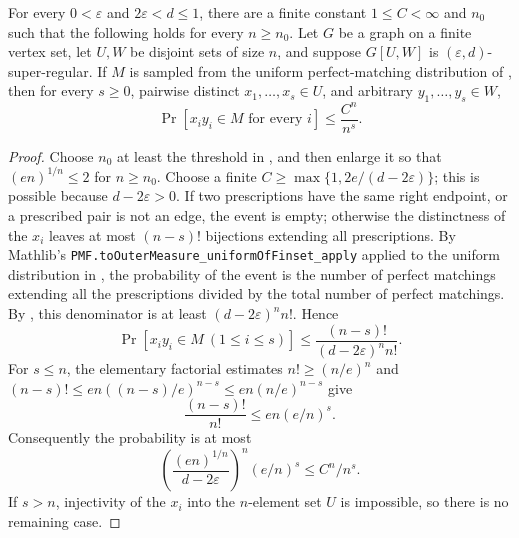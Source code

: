 \begin{lemma}
For every $0<\varepsilon$ and $2\varepsilon<d\leq1$, there are a finite constant $1\leq C<\infty$ and $n_0$ such that the following holds for every $n\geq n_0$.  Let $G$ be a graph on a finite vertex set, let $U,W$ be disjoint sets of size $n$, and suppose $G[U,W]$ is $(\varepsilon,d)$-super-regular.  If $M$ is sampled from the uniform perfect-matching distribution of , then for every $s\geq0$, pairwise distinct $x_1,\ldots,x_s\in U$, and arbitrary $y_1,\ldots,y_s\in W$,
\[
 \Pr[x_i y_i\in M\text{ for every }i]\leq \frac{C^n}{n^s}.
\]
\end{lemma}
\begin{proof}
Choose $n_0$ at least the threshold in , and then enlarge it so that $(en)^{1/n}\leq2$ for $n\geq n_0$.  Choose a finite $C\geq\max\{1,2e/(d-2\varepsilon)\}$; this is possible because $d-2\varepsilon>0$.  If two prescriptions have the same right endpoint, or a prescribed pair is not an edge, the event is empty; otherwise the distinctness of the $x_i$ leaves at most $(n-s)!$ bijections extending all prescriptions.  By Mathlib's \texttt{PMF.toOuterMeasure\_uniformOfFinset\_apply} applied to the uniform distribution in , the probability of the event is the number of perfect matchings extending all the prescriptions divided by the total number of perfect matchings.  By , this denominator is at least $(d-2\varepsilon)^n n!$.  Hence
\[
 \Pr[x_i y_i\in M\ (1\leq i\leq s)]
 \leq\frac{(n-s)!}{(d-2\varepsilon)^n n!}.
\]
For $s\leq n$, the elementary factorial estimates $n!\geq(n/e)^n$ and $(n-s)!\leq en((n-s)/e)^{n-s}\leq en(n/e)^{n-s}$ give
\[
 \frac{(n-s)!}{n!}\leq en(e/n)^s.
\]
Consequently the probability is at most
\[
 \left(\frac{(en)^{1/n}}{d-2\varepsilon}\right)^n(e/n)^s
 \leq C^n/n^s.
\]
If $s>n$, injectivity of the $x_i$ into the $n$-element set $U$ is impossible, so there is no remaining case.
\end{proof}
